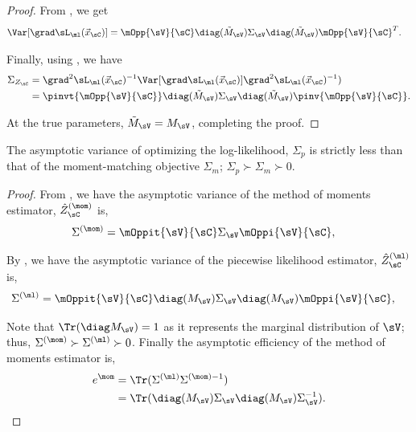 \begin{proof}
  From , we get
  \begin{align*}
    \Var [\grad \sL_\ml(\vec x_\sC)] &= \mOpp{\sV}{\sC} \diag(\tilde M_\sV) \Sigma_\sV \diag(\tilde M_\sV) \mOpp{\sV}{\sC}^T .
  \end{align*}

  Finally, using , we have
  \begin{align*}
    \Sigma_{Z_\sC} 
      &= \grad^2 \sL_\ml(\vec x_\sC)^{-1} \Var [\grad \sL_\ml(\vec x_\sC)] \grad^2 \sL_\ml(\vec x_\sC)^{-1}) \\
      &= \pinvt{\mOpp{\sV}{\sC}} \diag(\tilde M_\sV) \Sigma_\sV \diag(\tilde M_\sV) \pinv{\mOpp{\sV}{\sC}}.
  \end{align*}

  At the true parameters, $\tilde M_\sV = M_\sV$, completing the proof.
\end{proof}

\begin{corollary}
  The asymptotic variance of optimizing the log-likelihood, $\Sigma_p$
  is strictly less than that of the moment-matching objective
  $\Sigma_m$; $\Sigma_p \succ \Sigma_m \succ 0$.
\end{corollary}
\begin{proof}
  From , we have the asymptotic variance of the method of moments estimator, $\hat Z_\sC^{(\mom)}$ is,
  \begin{align*}
    \Sigma^{(\mom)} &= \mOppit{\sV}{\sC} \Sigma_\sV \mOppi{\sV}{\sC},
  \end{align*}

  By , we have the asymptotic variance of the piecewise likelihood estimator, $\hat Z_\sC^{(\ml)}$ is,
  \begin{align*}
    \Sigma^{(\ml)} &= \mOppit{\sV}{\sC} \diag(M_\sV) \Sigma_\sV \diag(M_\sV) \mOppi{\sV}{\sC},
  \end{align*}

  Note that $\Tr(\diag M_\sV) = 1$ as it represents the marginal
  distribution of $\sV$; thus, $\Sigma^{(\mom)} \succ \Sigma^{(\ml)}
  \succ 0$.  Finally the asymptotic efficiency of the method of moments
  estimator is, 
  \begin{align*}
    e^\mom &= \Tr( \Sigma^{(\ml)}\Sigma^{(\mom) -1} )  \\
           &= \Tr( \diag(M_\sV) \Sigma_\sV \diag(M_\sV) \Sigma_\sV^{-1} ).
  \end{align*}
\end{proof}

